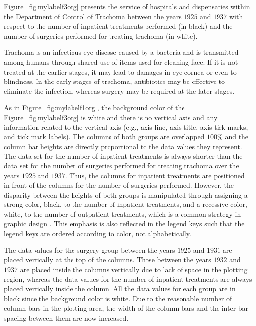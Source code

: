 Figure~\ref{fig:mylabelf3org} presents the service of hospitals and dispensaries within the Department of  Control of Trachoma between the years $1925$ and $1937$ with respect to the number of inpatient treatments performed (in black) and the number of surgeries performed for treating trachoma (in white).

Trachoma is an infectious eye disease caused by a bacteria and is transmitted among humans through shared use of items used for cleaning face. If it is not treated at the earlier stages, it may lead to damages in eye cornea or even to blindness. In the early stages of trachoma, antibiotics may be effective to eliminate the infection, whereas surgery may be required at the later stages.

As in Figure~\ref{fig:mylabelf1org}, the background color of the Figure~\ref{fig:mylabelf3org} is white and there is no vertical axis and any information related to the vertical axis (e.g., axis line, axis title, axis tick marks, and tick mark labels). The columns of both groups are overlapped $100\%$ and the column bar heights are directly proportional to the data values they represent. 
The data set for the number of inpatient treatments is always shorter than the data set for the number of surgeries performed for treating trachoma over the years $1925$ and $1937$. Thus, the columns for inpatient treatments are positioned in front of the columns for the number of surgeries performed.  However, the disparity between the heights of both groups is manipulated through assigning a strong color, black, to the number of inpatient treatments, and a recessive color, white, to the number of outpatient treatments, which is a common strategy in graphic design \citep{White}. This emphasis is also reflected in the legend keys such that the legend keys are ordered according to color, not alphabetically. 

The data values for the surgery group between the years $1925$ and $1931$ are placed vertically at the top of the columns. Those between the years $1932$ and $1937$ are placed inside the columns vertically due to lack of space in the plotting region, whereas the data values for the number of inpatient treatments are always placed vertically inside the column.  All the  data values for each group are in black since the background color is white. Due to the reasonable number of column bars in the plotting area, the width of the column bars and the inter-bar spacing between them are now increased.

